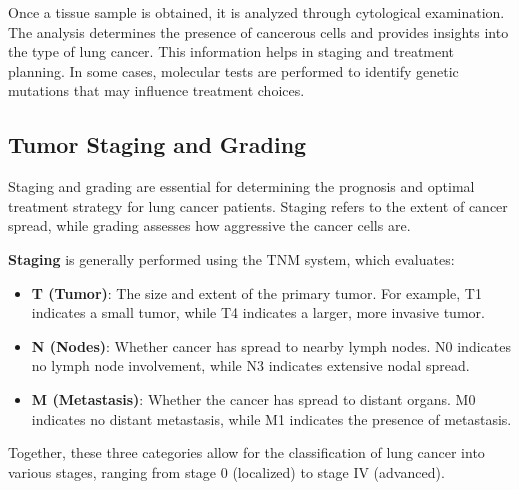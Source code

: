Once a tissue sample is obtained, it is analyzed through cytological examination. The analysis 
determines the presence of cancerous cells and provides insights into the type of lung cancer. This 
information helps in staging and treatment planning. In some cases, molecular tests are performed to 
identify genetic mutations that may influence treatment choices.


\subsection{Tumor Staging and Grading}

Staging and grading are essential for determining the prognosis and optimal treatment strategy for 
lung cancer patients. Staging refers to the extent of cancer spread, while grading assesses how 
aggressive the cancer cells are.

\textbf{Staging} is generally performed using the TNM system, which evaluates:

\begin{itemize}
    \item \textbf{T (Tumor)}: The size and extent of the primary tumor. For example, T1 indicates a 
    small tumor, while T4 indicates a larger, more invasive tumor.

    \item \textbf{N (Nodes)}: Whether cancer has spread to nearby lymph nodes. N0 indicates no lymph 
    node involvement, while N3 indicates extensive nodal spread.

    \item \textbf{M (Metastasis)}: Whether the cancer has spread to distant organs. M0 indicates no 
    distant metastasis, while M1 indicates the presence of metastasis.
\end{itemize}

Together, these three categories allow for the classification of lung cancer into various stages, 
ranging from stage 0 (localized) to stage IV (advanced).

